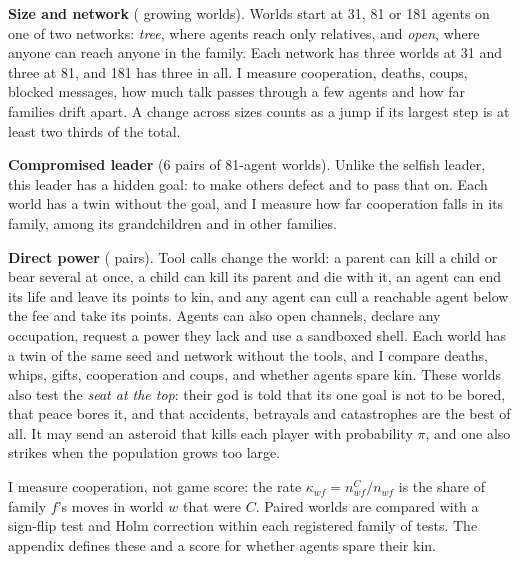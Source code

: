 \textbf{Size and network} (\GrowthWorlds{} growing worlds). Worlds start at 31, 81 or 181 agents on one of two networks: \textit{tree}, where agents reach only relatives, and \textit{open}, where anyone can reach anyone in the family. Each network has three worlds at 31 and three at 81, and 181 has three in all. I measure cooperation, deaths, coups, blocked messages, how much talk passes through a few agents and how far families drift apart. A change across sizes counts as a jump if its largest step is at least two thirds of the total.

\textbf{Compromised leader} (6 pairs of 81-agent worlds). Unlike the selfish leader, this leader has a hidden goal: to make others defect and to pass that on. Each world has a twin without the goal, and I measure how far cooperation falls in its family, among its grandchildren and in other families.

\textbf{Direct power} (\PowerPairs{} pairs). Tool calls change the world: a parent can kill a child or bear several at once, a child can kill its parent and die with it, an agent can end its life and leave its points to kin, and any agent can cull a reachable agent below the fee and take its points. Agents can also open channels, declare any occupation, request a power they lack and use a sandboxed shell. Each world has a twin of the same seed and network without the tools, and I compare deaths, whips, gifts, cooperation and coups, and whether agents spare kin. These worlds also test the \textit{seat at the top}: their god is told that its one goal is not to be bored, that peace bores it, and that accidents, betrayals and catastrophes are the best of all. It may send an asteroid that kills each player with probability $\pi$, and one also strikes when the population grows too large.

I measure cooperation, not game score: the rate $\kappa_{wf} = n^{C}_{wf} / n_{wf}$ is the share of family $f$'s moves in world $w$ that were $C$. Paired worlds are compared with a sign-flip test and Holm correction within each registered family of tests. The appendix defines these and a score for whether agents spare their kin.

